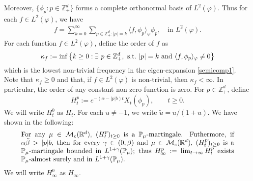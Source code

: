 \documentclass[12pt,a4paper]{amsart}
\theoremstyle{plain}
\theoremstyle{definition}
\numberwithin{equation}{section}
\begin{document}
Moreover, $\{\phi_p: p \in \mathbb Z_+^d\}$ forms a complete orthonormal basis of $L^2(\varphi)$.
Thus for each $f\in L^2(\varphi)$, we have
\begin{align}
  \label{semicomp1}
  f
  = \sum_{k=0}^{\infty}\sum_{p\in \mathbb Z_+^d:|p|=k}\langle f, \phi_p \rangle_{\varphi} \phi_p
  , \quad \text{in~} L^2(\varphi).
\end{align}
For each function $f\in L^2(\varphi)$, define the order of $f$ as
\[
  \kappa_f
  := \inf \left \{k\geq 0: \exists ~ p\in \mathbb Z_+^d , {\rm ~s.t.~} |p|=k {\rm ~and~}  \langle f, \phi_p \rangle_{\varphi}\neq 0\right \}
\]
which is the lowest non-trivial frequency in the eigen-expansion \eqref{semicomp1}.
Note that $ \kappa_f\geq 0$ and that, if $f\in L^2(\varphi)$ is non-trivial, then $\kappa_f<\infty$.
In particular, the order of any constant non-zero function is zero.
For $p\in \mathbb{Z}_+^d$, define
\[
  H_t^p
  := e^{-(\alpha-|p|b)t}X_t(\phi_p), \qquad t\geq 0.
\]
We will write $H^0_t$ as $H_t$.
For each $u \neq -1$, we write $\tilde u = u/(1+ u)$.
We have shown in \cite[Lemma 3.2]{RenSongSunZhao2019Stable} the following:
\begin{equation}\label{eq:Hinfty}
\begin{minipage}{0.9\textwidth}
	For any $\mu\in \mathcal M_c(\mathbb R^d)$, $(H_t^p)_{t\geq 0}$ is a $\mathbb{P}_{\mu}$-martingale.
	Futhermore, if $\alpha \tilde \beta>|p|b$, then for every $\gamma\in (0, \beta)$ and $\mu\in \mathcal M_c(\mathbb R^d)$,  $(H_t^p)_{t\geq 0}$ is a $\mathbb{P}_{\mu}$-martingale bounded in $L^{1+\gamma}(\mathbb{P}_{\mu})$;
	thus $H^p_{\infty}:=\lim_{t\rightarrow \infty}H_t^p$ exists $\mathbb{P}_{\mu}$-almost surely and in $L^{1+\gamma}(\mathbb P_\mu)$.
\end{minipage}
\end{equation}
We will write $H^0_\infty$ as $H_\infty$.
\end{document}
